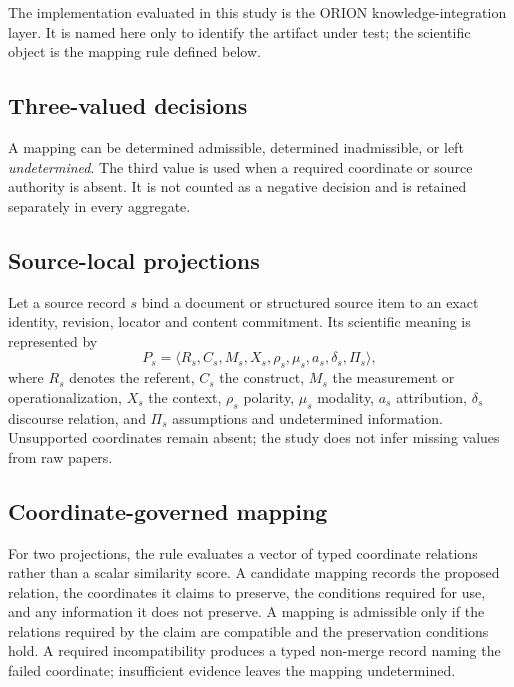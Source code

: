 The implementation evaluated in this study is the ORION knowledge-integration
layer. It is named here only to identify the artifact under test; the scientific
object is the mapping rule defined below.

\subsection{Three-valued decisions}

A mapping can be determined admissible, determined inadmissible, or left
\emph{undetermined}. The third value is used when a required coordinate or
source authority is absent. It is not counted as a negative decision and is
retained separately in every aggregate.

\subsection{Source-local projections}

Let a source record $s$ bind a document or structured source item to an exact
identity, revision, locator and content commitment. Its scientific meaning is
represented by
\begin{equation}
P_s=\langle R_s, C_s, M_s, X_s, \rho_s, \mu_s, a_s, \delta_s, \Pi_s\rangle,
\end{equation}
where $R_s$ denotes the referent, $C_s$ the construct, $M_s$ the measurement or
operationalization, $X_s$ the context, $\rho_s$ polarity, $\mu_s$ modality,
$a_s$ attribution, $\delta_s$ discourse relation, and $\Pi_s$ assumptions and
undetermined information. Unsupported coordinates remain absent; the study
does not infer missing values from raw papers.

\subsection{Coordinate-governed mapping}

For two projections, the rule evaluates a vector of typed coordinate relations
rather than a scalar similarity score. A candidate mapping records the proposed
relation, the coordinates it claims to preserve, the conditions required for
use, and any information it does not preserve. A mapping is admissible only if
the relations required by the claim are compatible and the preservation
conditions hold. A required incompatibility produces a typed non-merge record
naming the failed coordinate; insufficient evidence leaves the mapping
undetermined.

